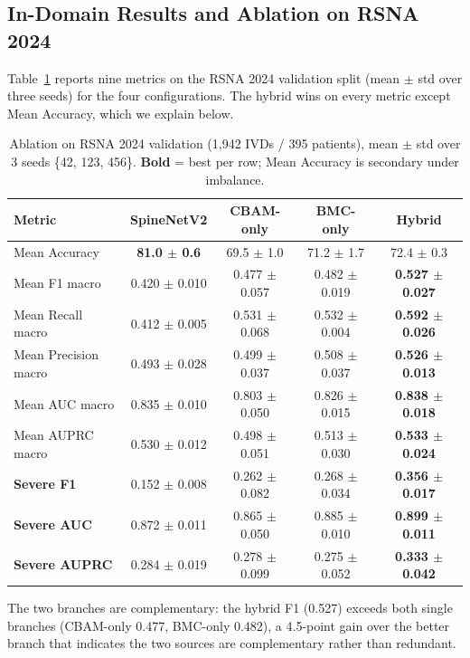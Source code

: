 \documentclass[runningheads]{llncs}
\newcommand{\best}[1]{\textcolor{best}{\textbf{#1}}}
\begin{document}
\subsection{In-Domain Results and Ablation on RSNA 2024}\label{exp2}

Table~\ref{tab:main} reports nine metrics on the RSNA 2024 validation split (mean $\pm$ std over three seeds) for the four configurations. The hybrid wins on every metric except Mean Accuracy, which we explain below.

\begin{table}[ht]
\centering
\caption{Ablation on RSNA 2024 validation (1{,}942 IVDs / 395 patients), mean $\pm$ std over 3 seeds \{42, 123, 456\}. \textbf{Bold} = best per row; Mean Accuracy is secondary under imbalance.}
\label{tab:main}
\footnotesize
\setlength{\tabcolsep}{3pt}
\begin{tabular}{@{}lcccc@{}}
\toprule
Metric & SpineNetV2 & CBAM-only & BMC-only & Hybrid \\
\midrule
Mean Accuracy        & \best{81.0 $\pm$ 0.6} & 69.5 $\pm$ 1.0 & 71.2 $\pm$ 1.7 & 72.4 $\pm$ 0.3 \\
Mean F1 macro        & 0.420 $\pm$ 0.010 & 0.477 $\pm$ 0.057 & 0.482 $\pm$ 0.019 & \best{0.527 $\pm$ 0.027} \\
Mean Recall macro    & 0.412 $\pm$ 0.005 & 0.531 $\pm$ 0.068 & 0.532 $\pm$ 0.004 & \best{0.592 $\pm$ 0.026} \\
Mean Precision macro & 0.493 $\pm$ 0.028 & 0.499 $\pm$ 0.037 & 0.508 $\pm$ 0.037 & \best{0.526 $\pm$ 0.013} \\
Mean AUC macro       & 0.835 $\pm$ 0.010 & 0.803 $\pm$ 0.050 & 0.826 $\pm$ 0.015 & \best{0.838 $\pm$ 0.018} \\
Mean AUPRC macro     & 0.530 $\pm$ 0.012 & 0.498 $\pm$ 0.051 & 0.513 $\pm$ 0.030 & \best{0.533 $\pm$ 0.024} \\
\midrule
\textbf{Severe F1}    & 0.152 $\pm$ 0.008 & 0.262 $\pm$ 0.082 & 0.268 $\pm$ 0.034 & \best{0.356 $\pm$ 0.017} \\
\textbf{Severe AUC}   & 0.872 $\pm$ 0.011 & 0.865 $\pm$ 0.050 & 0.885 $\pm$ 0.010 & \best{0.899 $\pm$ 0.011} \\
\textbf{Severe AUPRC} & 0.284 $\pm$ 0.019 & 0.278 $\pm$ 0.099 & 0.275 $\pm$ 0.052 & \best{0.333 $\pm$ 0.042} \\
\bottomrule
\end{tabular}
\end{table}

The two branches are complementary: the hybrid F1 (0.527) exceeds both single branches (CBAM-only 0.477, BMC-only 0.482), a 4.5-point gain over the better branch that indicates the two sources are complementary rather than redundant.
\end{document}
